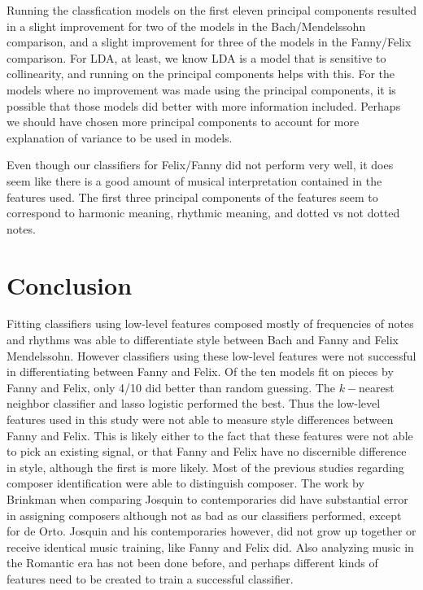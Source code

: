 \documentclass[12pt,twoside]{reedthesis}
\theoremstyle{definition}
\theoremstyle{definition}
\theoremstyle{definition}
\theoremstyle{remark}
\begin{document}
Running the classfication models on the first eleven principal
components resulted in a slight improvement for two of the models in the
Bach/Mendelssohn comparison, and a slight improvement for three of the
models in the Fanny/Felix comparison. For LDA, at least, we know LDA is
a model that is sensitive to collinearity, and running on the principal
components helps with this. For the models where no improvement was made
using the principal components, it is possible that those models did
better with more information included. Perhaps we should have chosen
more principal components to account for more explanation of variance to
be used in models.

Even though our classifiers for Felix/Fanny did not perform very well,
it does seem like there is a good amount of musical interpretation
contained in the features used. The first three principal components of
the features seem to correspond to harmonic meaning, rhythmic meaning,
and dotted vs not dotted notes.

\chapter*{Conclusion}\label{conclusion}

Fitting classifiers using low-level features composed mostly of
frequencies of notes and rhythms was able to differentiate style between
Bach and Fanny and Felix Mendelssohn. However classifiers using these
low-level features were not successful in differentiating between Fanny
and Felix. Of the ten models fit on pieces by Fanny and Felix, only 4/10
did better than random guessing. The \(k-\)nearest neighbor classifier
and lasso logistic performed the best. Thus the low-level features used
in this study were not able to measure style differences between Fanny
and Felix. This is likely either to the fact that these features were
not able to pick an existing signal, or that Fanny and Felix have no
discernible difference in style, although the first is more likely. Most
of the previous studies regarding composer identification were able to
distinguish composer. The work by Brinkman when comparing Josquin to
contemporaries did have substantial error in assigning composers
although not as bad as our classifiers performed, except for de Orto.
Josquin and his contemporaries however, did not grow up together or
receive identical music training, like Fanny and Felix did. Also
analyzing music in the Romantic era has not been done before, and
perhaps different kinds of features need to be created to train a
successful classifier.
\end{document}

